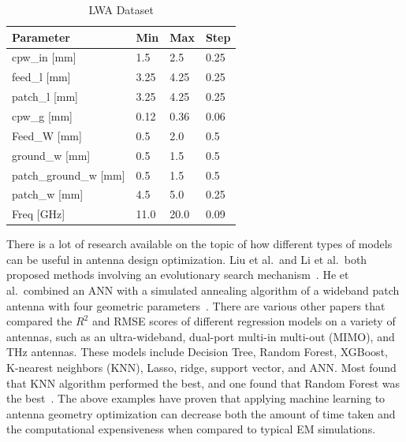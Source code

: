 \documentclass[conference]{IEEEtran}
\begin{document}
\begin{table}[h]
\caption{LWA Dataset}
\begin{center}
\begin{tabular}{ |l|l|l|l| }
    \hline
    Parameter & Min & Max & Step \\ 
    \hline
    cpw\_in [mm] & 1.5 & 2.5 & 0.25 \\
    \hline
    feed\_l [mm] & 3.25 & 4.25 & 0.25 \\
    \hline
    patch\_l [mm] & 3.25 & 4.25 & 0.25 \\
    \hline
    cpw\_g [mm] & 0.12 & 0.36 & 0.06 \\
    \hline
    Feed\_W [mm] & 0.5 & 2.0 & 0.5 \\
    \hline
    ground\_w [mm] & 0.5 & 1.5 & 0.5 \\
    \hline
    patch\_ground\_w [mm] & 0.5 & 1.5 & 0.5 \\
    \hline
    patch\_w [mm] & 4.5 & 5.0 & 0.25 \\
    \hline
    Freq [GHz] & 11.0 & 20.0 & 0.09 \\
    \hline
\end{tabular}
\end{center}
\label{antenna_design_lw}
\end{table}

There is a lot of research available on the topic of how different types of models can be useful in antenna design optimization. Liu et al.~and Li et al.~both proposed methods involving an evolutionary search mechanism~\cite{liu_efficient_2014,li_adaptive_2023}. He et al.~combined an ANN with a simulated annealing algorithm of a wideband patch antenna with four geometric parameters~\cite{10318051}. There are various other papers that compared the $R^2$ and RMSE scores of different regression models on a variety of antennas, such as an ultra-wideband, dual-port multi-in multi-out (MIMO), and THz antennas. These models include Decision Tree, Random Forest, XGBoost, K-nearest neighbors (KNN), Lasso, ridge, support vector, and ANN. Most found that KNN algorithm performed the best, and one found that Random Forest was the best~\cite{9119820,ranjan_ultra-wideband_2022,ranjan_design_2023,sharma_machine_2020,jain_estimation_2022,jain_design_2024}. The above examples have proven that applying machine learning to antenna geometry optimization can decrease both the amount of time taken and the computational expensiveness when compared to typical EM simulations.
\end{document}
